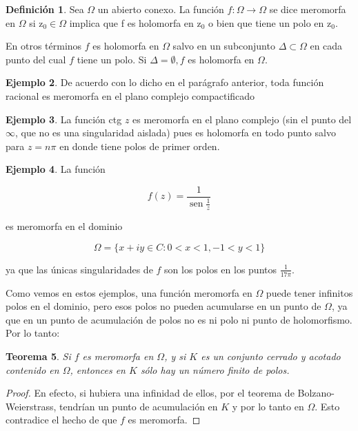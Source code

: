 \documentclass[10pt]{article}
\theoremstyle{plain}
\newtheorem{theorem}{Teorema}[section]
\theoremstyle{definition}
\newtheorem{definition}[theorem]{Definición}
\newtheorem{example}[theorem]{Ejemplo}
\theoremstyle{remark}
\begin{document}
\begin{definition}
Sea $\Omega$ un abierto conexo. La función $f: \Omega \rightarrow \Omega$ se dice meromorfa en $\Omega$ si $\mathrm{z}_{0} \in \Omega$ implica que f es holomorfa en $\mathrm{z}_{0}$ o bien que tiene un polo en $\mathrm{z}_{0}$.

En otros términos $f$ es holomorfa en $\Omega$ salvo en un subconjunto $\Delta \subset \Omega$ en cada punto del cual $f$ tiene un polo. Si $\Delta=\emptyset, f$ es holomorfa en $\Omega$.  
\end{definition}

\begin{example}
De acuerdo con lo dicho en el parágrafo anterior, toda función racional es meromorfa en el plano complejo compactificado  
\end{example}

\begin{example}
La función ctg $z$ es meromorfa en el plano complejo (sin el punto del $\infty$, que no es una singularidad aislada) pues es holomorfa en todo punto salvo para $z=n \pi$ en donde tiene polos de primer orden.
\end{example}

\begin{example}
La función

$$
f(z)=\frac{1}{\operatorname{sen} \frac{1}{z}}
$$

es meromorfa en el dominio

$$
\Omega=\{x+i y \in C: 0<x<1,-1<y<1\}
$$

ya que las únicas singularidades de $f$ son los polos en los puntos $\frac{1}{17 \pi}$.
\end{example}

Como vemos en estos ejemplos, una función meromorfa en $\Omega$ puede tener infinitos polos en el dominio, pero esos polos no pueden acumularse en un punto de $\Omega$, ya que en un punto de acumulación de polos no es ni polo ni punto de holomorfismo. Por lo tanto:

\begin{theorem}
Si $f$ es meromorfa en $\Omega$, y si $K$ es un conjunto cerrado y acotado contenido en $\Omega$, entonces en $K$ sólo hay un número finito de polos.
\end{theorem}
\begin{proof}
En efecto, si hubiera una infinidad de ellos, por el teorema de Bolzano-Weierstrass, tendrían un punto de acumulación en $K$ y por lo tanto en $\Omega$. Esto contradice el hecho de que $f$ es meromorfa.  
\end{proof}
\end{document}
